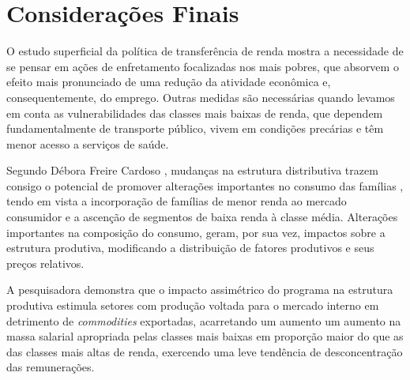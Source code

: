 \section{Considerações Finais}

O estudo superficial da política de transferência de renda mostra a necessidade de se pensar em ações de enfretamento focalizadas nos mais pobres, que absorvem o efeito mais pronunciado de uma redução da atividade econômica e, consequentemente, do emprego. Outras medidas são necessárias quando levamos em conta as vulnerabilidades das classes mais baixas de renda, que dependem fundamentalmente de transporte público, vivem em condições precárias e têm menor acesso a serviços de saúde.

Segundo Débora Freire Cardoso \cite{debora}, mudanças na estrutura distributiva trazem consigo o potencial de promover alterações importantes no consumo das famílias , tendo em vista a incorporação de famílias de menor renda ao mercado consumidor e a ascenção de segmentos de baixa renda à classe média. Alterações importantes na composição do consumo, geram, por sua vez, impactos sobre a estrutura produtiva, modificando a distribuição de fatores produtivos e seus preços relativos.

A pesquisadora demonstra que o impacto assimétrico do programa na estrutura produtiva estimula setores com produção voltada para o mercado interno em detrimento de \textit{commodities} exportadas, acarretando um aumento um aumento na massa salarial apropriada pelas classes mais baixas em proporção maior do que as das classes mais altas de renda, exercendo uma leve tendência de desconcentração das remunerações. 